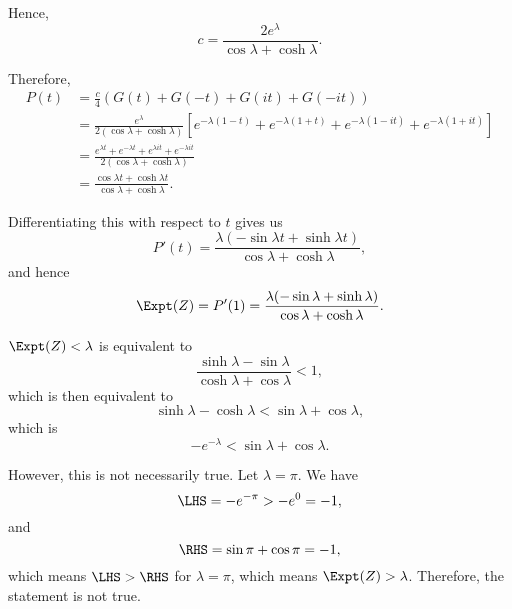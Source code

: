 \begin{enumerate}
          Hence,
          \[
              c = \frac{2e^\lambda}{\cos \lambda + \cosh \lambda}.
          \]

          Therefore,
          \begin{align*}
              P(t) & = \frac{c}{4} \left(G(t) + G(-t) + G(it) + G(-it)\right)                                                                                                  \\
                   & = \frac{e^\lambda}{2 (\cos \lambda + \cosh \lambda)} \left[e^{-\lambda(1 - t)} + e^{-\lambda(1 + t)} + e^{-\lambda(1 - it)} + e^{-\lambda(1 + it)}\right] \\
                   & = \frac{e^{\lambda t} + e^{-\lambda t} + e^{\lambda it} + e^{-\lambda it}}{2 (\cos \lambda + \cosh \lambda)}                                              \\
                   & = \frac{\cos \lambda t + \cosh \lambda t}{\cos \lambda + \cosh \lambda}.
          \end{align*}

          Differentiating this with respect to \(t\) gives us
          \[
              P'(t) = \frac{\lambda (-\sin \lambda t + \sinh \lambda t)}{\cos \lambda + \cosh \lambda},
          \]
          and hence
          \[
              \Expt(Z) = P'(1) = \frac{\lambda(- \sin \lambda + \sinh \lambda)}{\cos \lambda + \cosh \lambda}.
          \]

          \(\Expt(Z) < \lambda\) is equivalent to
          \[
              \frac{\sinh \lambda - \sin \lambda}{\cosh \lambda + \cos \lambda} < 1,
          \]
          which is then equivalent to
          \[
              \sinh \lambda - \cosh \lambda < \sin \lambda + \cos \lambda,
          \]
          which is
          \[
              - e^{-\lambda} < \sin \lambda + \cos \lambda.
          \]

          However, this is not necessarily true. Let \(\lambda = \pi\). We have
          \[
              \LHS = - e^{- \pi} > - e^{0} = -1,
          \]
          and
          \[
              \RHS = \sin \pi + \cos \pi = -1,
          \]
          which means \(\LHS > \RHS\) for \(\lambda = \pi\), which means \(\Expt(Z) > \lambda\). Therefore, the statement is not true.

\end{enumerate}